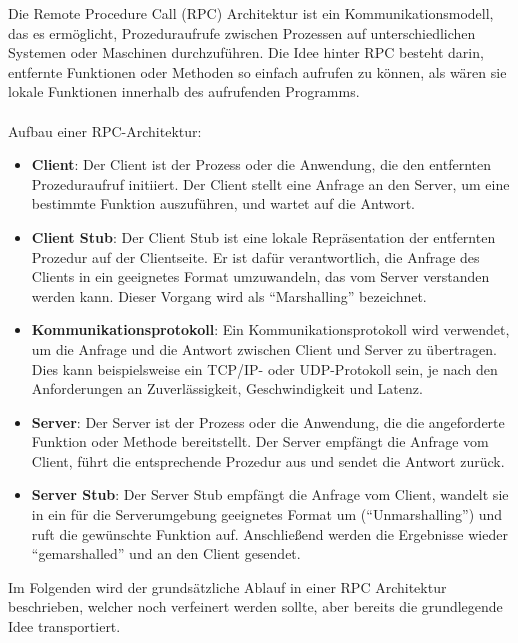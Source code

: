 \documentclass[../vs-script-first-v01.tex]{subfiles}
\begin{document}
Die Remote Procedure Call (RPC) Architektur ist ein Kommunikationsmodell, das es ermöglicht, Prozeduraufrufe zwischen Prozessen auf unterschiedlichen Systemen oder Maschinen durchzuführen. Die Idee hinter RPC besteht darin, entfernte Funktionen oder Methoden so einfach aufrufen zu können, als wären sie lokale Funktionen innerhalb des aufrufenden Programms.
\\\\
Aufbau einer RPC-Architektur:
\begin{itemize} 
\item \textbf{Client}: Der Client ist der Prozess oder die Anwendung, die den entfernten Prozeduraufruf initiiert. Der Client stellt eine Anfrage an den Server, um eine bestimmte Funktion auszuführen, und wartet auf die Antwort.
\item \textbf{Client Stub}: Der Client Stub ist eine lokale Repräsentation der entfernten Prozedur auf der Clientseite. Er ist dafür verantwortlich, die Anfrage des Clients in ein geeignetes Format umzuwandeln, das vom Server verstanden werden kann. Dieser Vorgang wird als \enquote{Marshalling} bezeichnet.
\item \textbf{Kommunikationsprotokoll}: Ein Kommunikationsprotokoll wird verwendet, um die Anfrage und die Antwort zwischen Client und Server zu übertragen. Dies kann beispielsweise ein TCP/IP- oder UDP-Protokoll sein, je nach den Anforderungen an Zuverlässigkeit, Geschwindigkeit und Latenz.
\item \textbf{Server}: Der Server ist der Prozess oder die Anwendung, die die angeforderte Funktion oder Methode bereitstellt. Der Server empfängt die Anfrage vom Client, führt die entsprechende Prozedur aus und sendet die Antwort zurück.
\item \textbf{Server Stub}: Der Server Stub empfängt die Anfrage vom Client, wandelt sie in ein für die Serverumgebung geeignetes Format um (\enquote{Unmarshalling}) und ruft die gewünschte Funktion auf. Anschließend werden die Ergebnisse wieder \enquote{gemarshalled} und an den Client gesendet.
\end{itemize}     
Im Folgenden wird der grundsätzliche Ablauf in einer RPC Architektur beschrieben, welcher noch verfeinert werden sollte, aber bereits die grundlegende Idee transportiert. 
\end{document}
